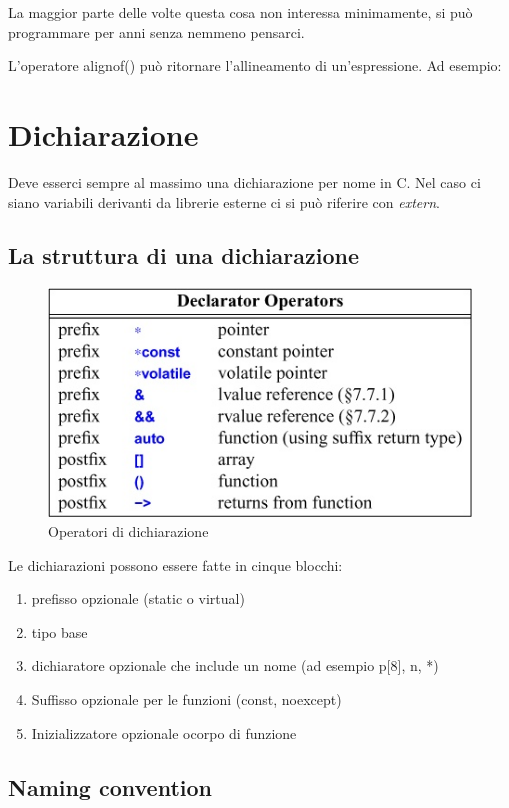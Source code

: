 \documentclass[11pt,a4paper]{book}
\begin{document}
La maggior parte delle volte questa cosa non interessa minimamente, si può programmare per anni senza nemmeno pensarci.

L'operatore alignof() può ritornare l'allineamento di un'espressione. Ad esempio:

\section{Dichiarazione}
Deve esserci sempre al massimo una dichiarazione per nome in C. Nel caso ci siano variabili derivanti da librerie esterne ci si può riferire con \emph{extern}.

\subsection{La struttura di una dichiarazione}
\begin{figure}[h!]
	\begin{center}
		\includegraphics[scale=0.6]{img/013.jpg}
		\caption{Operatori di dichiarazione}
		\label{fig: 013}
	\end{center}
\end{figure}

Le dichiarazioni possono essere fatte in cinque blocchi:
\begin{enumerate}
	\item prefisso opzionale (static o virtual)
	\item tipo base
	\item dichiaratore opzionale che include un nome (ad esempio p[8], n, *)
	\item Suffisso opzionale per le funzioni (const, noexcept)
	\item Inizializzatore opzionale ocorpo di funzione
\end{enumerate}

\subsection{Naming convention}
\end{document}
